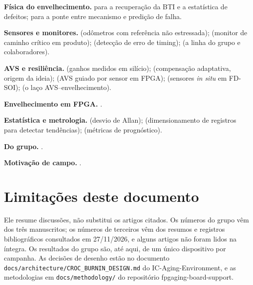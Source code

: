\documentclass[11pt,a4paper]{article}
\begin{document}
\textbf{Física do envelhecimento.} \cite{grasser2010tdds} para a recuperação da BTI e a estatística de defeitos;
\cite{agarwal2007failure} para a ponte entre mecanismo e predição de falha.

\textbf{Sensores e monitores.} \cite{kim2008odometer,keane2010odometer} (odômetros com referência não estressada);
\cite{drake2007cpm} (monitor de caminho crítico em produto); \cite{ernst2004razor} (detecção de erro de timing);
\cite{nogueira2025autotuning,vargas2025slmcore} (a linha do grupo e colaboradores).

\textbf{AVS e resiliência.} \cite{bowman2011resilient} (ganhos medidos em silício); \cite{tschanz2002abb} (compensação
adaptativa, origem da ideia); \cite{niemann2020avs} (AVS guiado por sensor em FPGA); \cite{saliva2015fdsoi} (sensores
\emph{in situ} em FD-SOI); \cite{xie2026agingavs} (o laço AVS--envelhecimento).

\textbf{Envelhecimento em FPGA.} \cite{stott2010degradation,amouri2014aging,valdespena2013,huang2022aging,sobas2024finfet}.

\textbf{Estatística e metrologia.} \cite{allan1966statistics} (desvio de Allan); \cite{weatherhead1998trends}
(dimensionamento de registros para detectar tendências); \cite{saxena2008metrics} (métricas de prognóstico).

\textbf{Do grupo.} \cite{nogueira2025autotuning,alencar2026sbcci,alencar2027dt}.

\textbf{Motivação de campo.} \cite{hochschild2021cores,dixit2021sdc}.

\section{Limitações deste documento}

Ele resume discussões, não substitui os artigos citados. Os números do grupo vêm dos três manuscritos; os números de
terceiros vêm dos resumos e registros bibliográficos consultados em 27/11/2026, e alguns artigos não foram lidos na
íntegra. Os resultados do grupo são, até aqui, de um único dispositivo por campanha. As decisões de desenho estão no
documento \texttt{docs/architecture/CROC\_BURNIN\_DESIGN.md} do IC-Aging-Environment, e as metodologias em
\texttt{docs/methodology/} do repositório fpgaging-board-support.
\end{document}
